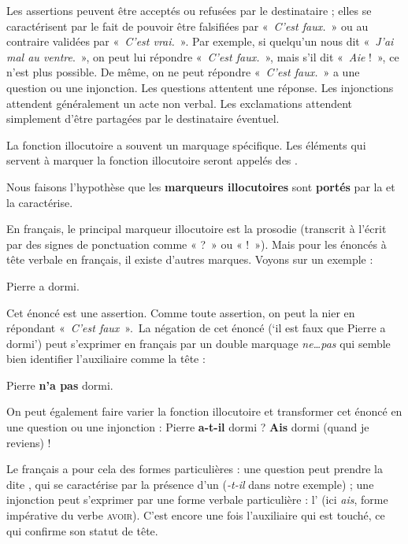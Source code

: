 Les assertions peuvent être acceptés ou refusées par le destinataire ; elles se caractérisent par le fait de pouvoir être falsifiées par «~\textit{C’est faux.}~» ou au contraire validées par «~\textit{C’est vrai.}~». Par exemple, si quelqu’un nous dit «~\textit{J’ai mal au ventre}.~», on peut lui répondre «~\textit{C’est faux.}~», mais s’il dit «~\textit{Aie} !~», ce n’est plus possible. De même, on ne peut répondre «~\textit{C’est faux.}~» a une question ou une injonction. Les questions attentent une réponse. Les injonctions attendent généralement un acte non verbal. Les exclamations attendent simplement d’être partagées par le destinataire éventuel.

La fonction illocutoire a souvent un marquage spécifique. Les éléments qui servent à marquer la fonction illocutoire seront appelés des .

\begin{styleLivreImportant}
Nous faisons l’hypothèse que les \textbf{marqueurs illocutoires} sont \textbf{portés} par la  et la caractérise.
\end{styleLivreImportant}

En français, le principal marqueur illocutoire est la prosodie (transcrit à l’écrit par des signes de ponctuation comme « ?~» ou « !~»). Mais pour les énoncés à tête verbale en français, il existe d’autres marques. Voyons sur un exemple :

\ea
{Pierre a dormi}.
\z

Cet énoncé est une assertion. Comme toute assertion, on peut la nier en répondant «~\textit{C’est faux}~».~La négation de cet énoncé (‘il est faux que Pierre a dormi’) peut s’exprimer en français par un double marquage \textit{ne…pas} qui semble bien identifier l’auxiliaire comme la tête :

\ea
{Pierre} \textbf{{n’a}  {pas}}  {dormi.}
\z

On peut également faire varier la fonction illocutoire et transformer cet énoncé en une question ou une injonction :
\ea
{Pierre} \textbf{{a-t-il}}  {dormi} ?
\z
\ea
\textbf{{Ais}}  {dormi (quand}  {je reviens)} !
\z

Le français a pour cela des formes particulières : une question peut prendre la  dite , qui se caractérise par la présence d’un  (\textit{{}-t-il} dans notre exemple) ; une injonction peut s’exprimer par une forme verbale particulière : l’ (ici \textit{ais}, forme impérative du verbe \textsc{avoir}). C’est encore une fois l’auxiliaire qui est touché, ce qui confirme son statut de tête.

